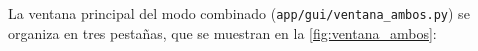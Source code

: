 
La ventana principal del modo combinado
(\texttt{app/gui/ventana\_ambos.py}) se organiza en tres pestañas, que
se muestran en la \cref{fig:ventana_ambos}:

